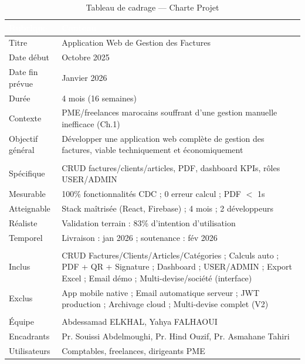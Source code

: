 \begin{table}[H]
\centering
\caption{Tableau de cadrage — Charte Projet}
\label{tab:cadrage}
\begin{tabularx}{\textwidth}{|l|X|}
\hline
\rowcolor{emsiblue}\textcolor{white}{\textbf{Rubrique}} & \textcolor{white}{\textbf{Contenu}} \\
\hline
Titre & Application Web de Gestion des Factures \\
Date début & Octobre 2025 \\
Date fin prévue & Janvier 2026 \\
Durée & 4 mois (16 semaines) \\
Contexte & PME/freelances marocains souffrant d'une gestion manuelle inefficace (Ch.1) \\
Objectif général & Développer une application web complète de gestion des factures, viable techniquement et économiquement \\
\hline
\rowcolor{lightblue}\multicolumn{2}{|l|}{\textbf{Objectifs SMART}} \\
\hline
Spécifique & CRUD factures/clients/articles, PDF, dashboard KPIs, rôles USER/ADMIN \\
Mesurable & 100\% fonctionnalités CDC ; 0 erreur calcul ; PDF $<$ 1s \\
Atteignable & Stack maîtrisée (React, Firebase) ; 4 mois ; 2 développeurs \\
Réaliste & Validation terrain : 83\% d'intention d'utilisation \\
Temporel & Livraison : jan 2026 ; soutenance : fév 2026 \\
\hline
\rowcolor{lightblue}\multicolumn{2}{|l|}{\textbf{Périmètre}} \\
\hline
Inclus & CRUD Factures/Clients/Articles/Catégories ; Calculs auto ; PDF + QR + Signature ; Dashboard ; USER/ADMIN ; Export Excel ; Email démo ; Multi-devise/société (interface) \\
Exclus & App mobile native ; Email automatique serveur ; JWT production ; Archivage cloud ; Multi-devise complet (V2) \\
\hline
\rowcolor{lightblue}\multicolumn{2}{|l|}{\textbf{Parties prenantes}} \\
\hline
Équipe & Abdessamad ELKHAL, Yahya FALHAOUI \\
Encadrants & Pr. Souissi Abdelmoughi, Pr. Hind Ouzif, Pr. Asmahane Tahiri \\
Utilisateurs & Comptables, freelances, dirigeants PME \\

\end{tabularx}
\end{table}
